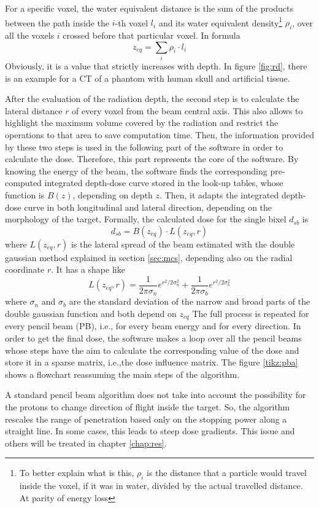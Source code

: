 \documentclass[12pt, a4paper, twoside]{book}
\begin{document}
For a specific voxel, the water equivalent distance is the sum of the products between the path inside the $i$-th voxel $l_i$ and its water equivalent density\footnote{To better explain what is this, $\rho_i$ is the distance that a particle would travel inside the voxel, if it was in water, divided by the actual travelled distance. At parity of energy loss} $\rho_i$, over all the voxels $i$ crossed before that particular voxel.
In formula
\[
z_{eq} = \sum_{i} \rho_i\cdot l_i
\]
Obviously, it is a value that strictly increases with depth.
In figure \ref{fig:rd}, there is an example for a CT of a phantom with human skull and artificial tissue.

After the evaluation of the radiation depth, the second step is to calculate the lateral distance  $r$ of every voxel from the beam central axis. This also allows to highlight the maximum volume covered by the radiation and restrict the operations to that area to save computation time. 
Then, the information provided by these two steps is used in the following part of the software in order to calculate the dose. Therefore, this part represents the core of the software. By knowing the energy of the beam, the software finds the corresponding pre-computed integrated depth-dose curve stored in the look-up tables, whose function is $B(z)$, depending on depth $z$. Then, it adapts the integrated depth-dose curve in both longitudinal and lateral direction, depending on the morphology of the target. 
Formally, the calculated dose for the single bixel $d_{sb}$ is 	
\[
d_{sb} = B(z_{eq}) \cdot L(z_{eq},r)
\]
where $L(z_{eq},r)$ is the lateral spread of the beam estimated with the double gaussian method explained in section \ref{sec:mcs}, depending also on the radial coordinate $r$. It has a shape like
\[
L(z_{eq},r) = \frac{1}{{2\pi}\sigma_n}e^{r^2/2\sigma_n^2} + \frac{1}{{2\pi}\sigma_b}e^{r^2/2\sigma_b^2} 
\]
where $\sigma_n$ and $\sigma_b$ are the standard deviation of the narrow and broad parts of the double gaussian function and both depend on $z_{eq}$
The full process is repeated for every pencil beam (PB), i.e., for every beam energy and for every direction. In order to get the final dose, the software makes a loop over all the pencil beams whose steps have the aim to calculate the corresponding value of the dose and store it in a sparse matrix, i.e.,the dose influence matrix.
The figure \ref{tikz:pba} shows a flowchart reassuming the main steps of the algorithm.

A standard pencil beam algorithm does not take into account the possibility for the protons to change direction of flight inside the target. So, the algorithm rescales the range of penetration based only on the stopping power along a straight line. In some cases, this leads to steep dose gradients. This issue and others will be treated in chapter \ref{chap:res}.
\end{document}
